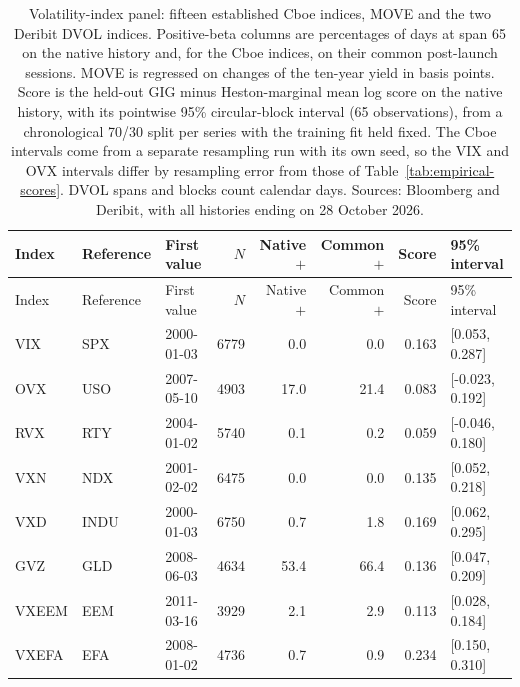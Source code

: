 \documentclass[11pt,a4paper]{article}
\theoremstyle{definition}
\theoremstyle{remark}
\begin{document}
{\small\setlength{\tabcolsep}{3pt}\begin{longtable}{@{}l P{22mm} l r r r r l@{}}\caption{Volatility-index panel: fifteen established Cboe indices, MOVE and the two Deribit DVOL indices. Positive-beta columns are percentages of days at span 65 on the native history and, for the Cboe indices, on their common post-launch sessions. MOVE is regressed on changes of the ten-year yield in basis points. Score is the held-out GIG minus Heston-marginal mean log score on the native history, with its pointwise 95\% circular-block interval (65 observations), from a chronological 70/30 split per series with the training fit held fixed. The Cboe intervals come from a separate resampling run with its own seed, so the VIX and OVX intervals differ by resampling error from those of Table~\ref{tab:empirical-scores}. DVOL spans and blocks count calendar days. Sources: Bloomberg and Deribit, with all histories ending on 28 October 2026.}\label{tab:cboe-panel}\\\toprule Index & Reference & First value & $N$ & Native $+$ & Common $+$ & Score & 95\% interval\\\midrule\endfirsthead\toprule Index & Reference & First value & $N$ & Native $+$ & Common $+$ & Score & 95\% interval\\\midrule\endhead

VIX & SPX & 2000-01-03 & 6779 & 0.0 & 0.0 & 0.163 & [0.053, 0.287] \\

OVX & USO & 2007-05-10 & 4903 & 17.0 & 21.4 & 0.083 & [-0.023, 0.192] \\

RVX & RTY & 2004-01-02 & 5740 & 0.1 & 0.2 & 0.059 & [-0.046, 0.180] \\

VXN & NDX & 2001-02-02 & 6475 & 0.0 & 0.0 & 0.135 & [0.052, 0.218] \\

VXD & INDU & 2000-01-03 & 6750 & 0.7 & 1.8 & 0.169 & [0.062, 0.295] \\

GVZ & GLD & 2008-06-03 & 4634 & 53.4 & 66.4 & 0.136 & [0.047, 0.209] \\

VXEEM & EEM & 2011-03-16 & 3929 & 2.1 & 2.9 & 0.113 & [0.028, 0.184] \\

VXEFA & EFA & 2008-01-02 & 4736 & 0.7 & 0.9 & 0.234 & [0.150, 0.310] \\


\end{longtable}}
\end{document}
